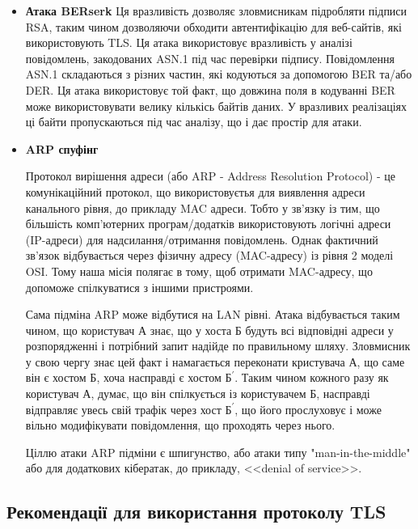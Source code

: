 \begin{itemize}
    \item \textbf{Атака BERserk}
    Ця вразливість дозволяє зловмисникам підробляти підписи RSA, таким чином дозволяючи обходити автентифікацію для веб-сайтів, які використовують TLS. Ця атака використовує вразливість у аналізі повідомлень, закодованих ASN.1 під час перевірки підпису. Повідомлення ASN.1 складаються з різних частин, які кодуються за допомогою BER та/або DER. Ця атака використовує той факт, що довжина поля в кодуванні BER може використовувати велику кількісь байтів даних. У вразливих реалізаціях ці байти пропускаються під час аналізу, що і дає простір для атаки.
    

    \item \textbf{ARP спуфінг}

    Протокол вирішення адреси (або ARP - Address Resolution Protocol) - це комунікаційний протокол, що використовуєтья для виявлення адреси канального рівня, до прикладу MAC адреси. Тобто у зв'язку із тим, що більшість комп’ютерних програм/додатків використовують логічні адреси (IP-адреси) для надсилання/отримання повідомлень. Однак фактичний зв’язок відбувається через фізичну адресу (MAC-адресу) із рівня 2 моделі OSI. Тому наша місія полягає в тому, щоб отримати MAC-адресу, що допоможе спілкуватися з іншими пристроями. 


    Сама підміна ARP може відбутися на LAN рівні. Атака відбувається таким чином, що користувач А знає, що у хоста Б будуть всі відповідні адреси у розпорядженні і потрібний запит надійде по правильному шляху. Зловмисник у свою чергу знає цей факт і намагається переконати кристувача А, що саме він є хостом Б, хоча насправді є хостом $\text{Б}^{'}$. Таким чином кожного разу як користувач А, думає, що він спілкується із користувачем Б, насправді відправляє увесь свій трафік через хост $\text{Б}^{'}$, що його прослуховує і може вільно модифікувати повідомлення, що проходять через нього.


    Ціллю атаки ARP підміни є шпигунство, або атаки типу "man-in-the-middle" або для додаткових кібератак, до прикладу, <<denial of service>>.
    
\end{itemize}


\subsection{Рекомендації для використання протоколу TLS}

